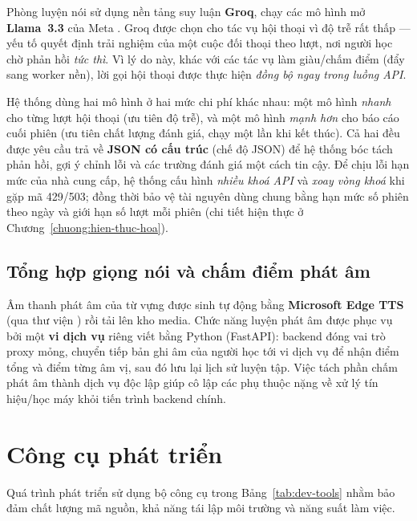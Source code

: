 Phòng luyện nói sử dụng nền tảng suy luận \textbf{Groq}, chạy các mô hình mở
\textbf{Llama~3.3} của Meta \cite{grattafiori2024llama3}. Groq được chọn cho
tác vụ hội thoại vì độ trễ rất thấp --- yếu tố quyết định trải nghiệm của một
cuộc đối thoại theo lượt, nơi người học chờ phản hồi \textit{tức thì}. Vì lý
do này, khác với các tác vụ làm giàu/chấm điểm (đẩy sang worker nền), lời gọi
hội thoại được thực hiện \textit{đồng bộ ngay trong luồng API}.

Hệ thống dùng hai mô hình ở hai mức chi phí khác nhau: một mô hình \textit{nhanh}
cho từng lượt hội thoại (ưu tiên độ trễ), và một mô hình \textit{mạnh hơn} cho
báo cáo cuối phiên (ưu tiên chất lượng đánh giá, chạy một lần khi kết thúc).
Cả hai đều được yêu cầu trả về \textbf{JSON có cấu trúc} (chế độ JSON) để hệ
thống bóc tách phản hồi, gợi ý chỉnh lỗi và các trường đánh giá một cách tin
cậy. Để chịu lỗi hạn mức của nhà cung cấp, hệ thống cấu hình \textit{nhiều
khoá API} và \textit{xoay vòng khoá} khi gặp mã 429/503; đồng thời bảo vệ tài
nguyên dùng chung bằng hạn mức số phiên theo ngày và giới hạn số lượt mỗi
phiên (chi tiết hiện thực ở Chương~\ref{chuong:hien-thuc-hoa}).

\subsection{Tổng hợp giọng nói và chấm điểm phát âm}
\label{subsec:tts-pron}

Âm thanh phát âm của từ vựng được sinh tự động bằng \textbf{Microsoft Edge
TTS} (qua thư viện ) rồi tải lên kho media. Chức năng luyện
phát âm được phục vụ bởi một \textbf{vi dịch vụ} riêng viết bằng Python
(FastAPI): backend đóng vai trò proxy mỏng, chuyển tiếp bản ghi âm của người
học tới vi dịch vụ để nhận điểm tổng và điểm từng âm vị, sau đó lưu lại lịch
sử luyện tập. Việc tách phần chấm phát âm thành dịch vụ độc lập giúp cô lập
các phụ thuộc nặng về xử lý tín hiệu/học máy khỏi tiến trình backend chính.

\section{Công cụ phát triển}
\label{sec:cong-cu-phat-trien}

Quá trình phát triển sử dụng bộ công cụ trong Bảng~\ref{tab:dev-tools} nhằm
bảo đảm chất lượng mã nguồn, khả năng tái lập môi trường và năng suất làm
việc.

